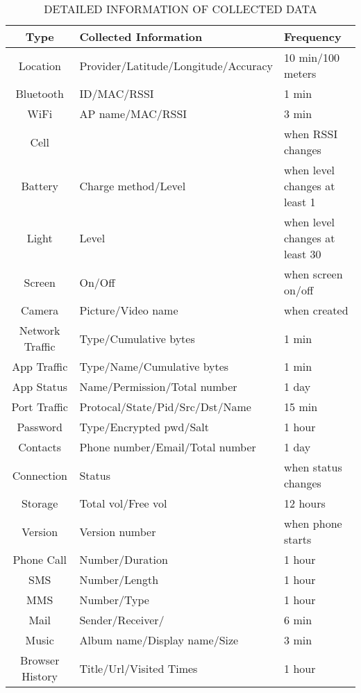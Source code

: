 \begin{table}[ht] 
\caption{DETAILED INFORMATION OF COLLECTED DATA} 
\centering  
\begin{tabular}{c|l|l}
\hline
		  Type			& Collected Information 					& Frequency \\ [0.5ex] 
\hline\hline Location			& Provider/Latitude/Longitude/Accuracy		& 10 min/100 meters	\\ 
\hline	  Bluetooth 		& ID/MAC/RSSI	    						& 1 min \\
\hline 	  WiFi 			& AP name/MAC/RSSI					& 3 min \\
\hline 	  Cell   			& 									& when RSSI changes \\
\hline	  Battery			& Charge method/Level	    				& when level changes at least 1 \\
\hline	  Light			& Level	    							& when level changes at least 30 \\
\hline	  Screen			& On/Off 							 	& when screen on/off \\
\hline 	  Camera			& Picture/Video name			        	        & when created	 \\
\hline 	  Network Traffic 	& Type/Cumulative bytes					& 1 min	 \\
\hline	  App Traffic		& Type/Name/Cumulative bytes			& 1 min \\
\hline	  App Status 		& Name/Permission/Total number			& 1 day \\
\hline 	  Port Traffic	        & Protocal/State/Pid/Src/Dst/Name			& 15 min \\
\hline 	  Password	  	& Type/Encrypted pwd/Salt				& 1 hour \\
\hline 	  Contacts			& Phone number/Email/Total number		& 1 day \\
\hline 	  Connection		& Status								& when status changes \\
\hline 	  Storage			& Total vol/Free vol						& 12 hours \\
\hline 	  Version			& Version number							& when phone starts \\
\hline 	  Phone Call		& Number/Duration						& 1 hour \\
\hline 	  SMS			& Number/Length						& 1 hour \\
\hline 	  MMS			& Number/Type						& 1 hour \\
\hline 	  Mail			& Sender/Receiver/						& 6 min \\
\hline 	  Music			& Album name/Display name/Size			& 3 min \\
\hline 	  Browser History	& Title/Url/Visited Times					& 1 hour \\
\hline
\end{tabular}
\label{table:detailed_data} 
\end{table}
